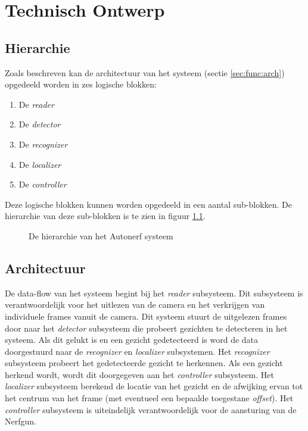 \chapter{Technisch Ontwerp}
\label{ch:technical}

\section{Hierarchie}

Zoals beschreven kan de architectuur van het systeem (sectie \ref{sec:func:arch})
opgedeeld worden in zes logische blokken:

\begin{enumerate}
    \item De \emph{reader}
    \item De \emph{detector}
    \item De \emph{recognizer}
    \item De \emph{localizer}
    \item De \emph{controller}
\end{enumerate}

Deze logische blokken kunnen worden opgedeeld in een aantal sub-blokken. De
hierarchie van deze sub-blokken is te zien in figuur \ref{fig:hierarchy}.

\begin{figure}[H]
        
    \caption{De hierarchie van het Autonerf systeem}
    \label{fig:hierarchy}
\end{figure}

\section{Architectuur}

De data-flow van het systeem begint bij het \emph{reader} subsysteem. Dit subsysteem
is verantwoordelijk voor het uitlezen van de camera en het verkrijgen van individuele
frames vanuit de camera. Dit systeem stuurt de uitgelezen frames door naar het
\emph{detector} subsysteem die probeert gezichten te detecteren in het systeem.
Als dit gelukt is en een gezicht gedetecteerd is word de data doorgestuurd naar
de \emph{recognizer} en \emph{localizer} subsystemen. Het \emph{recognizer}
subsysteem probeert het gedetecteerde gezicht te herkennen. Als een gezicht
herkend wordt, wordt dit doorgegeven aan het \emph{controller} subsysteem.
Het \emph{localizer} subsysteem berekend de locatie van het gezicht en de afwijking
ervan tot het centrum van het frame (met eventueel een bepaalde toegestane
\emph{offset}). Het \emph{controller} subsysteem is uiteindelijk verantwoordelijk
voor de aansturing van de Nerfgun.

